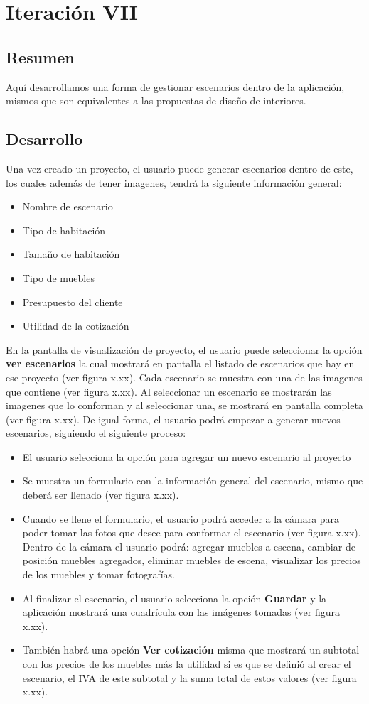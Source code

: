\section{Iteración VII}
\subsection{Resumen}
Aquí desarrollamos una forma de gestionar escenarios dentro de la aplicación, mismos que son equivalentes a las propuestas de diseño de interiores.

\subsection{Desarrollo}
Una vez creado un proyecto, el usuario puede generar escenarios dentro de este, los cuales además de tener imagenes, tendrá la siguiente información general:
\begin{itemize}
	\item Nombre de escenario
	\item Tipo de habitación
	\item Tamaño de habitación
	\item Tipo de muebles
	\item Presupuesto del cliente
	\item Utilidad de la cotización
\end{itemize}

En la pantalla de visualización de proyecto, el usuario puede seleccionar la opción \textbf{ver escenarios} la cual mostrará en pantalla el listado de escenarios que hay en ese proyecto (ver figura x.xx). Cada escenario se muestra con una de las imagenes que contiene (ver figura x.xx). Al seleccionar un escenario se mostrarán las imagenes que lo conforman y al seleccionar una, se mostrará en pantalla completa (ver figura x.xx). De igual forma, el usuario podrá empezar a generar nuevos escenarios, siguiendo el siguiente proceso:
\begin{itemize}
	\item El usuario selecciona la opción para agregar un nuevo escenario al proyecto
	\item Se muestra un formulario con la información general del escenario, mismo que deberá ser llenado (ver figura x.xx).
	\item Cuando se llene el formulario, el usuario podrá acceder a la cámara para poder tomar las fotos que desee para conformar el escenario (ver figura x.xx). Dentro de la cámara el usuario podrá: agregar muebles a escena, cambiar de posición muebles agregados, eliminar muebles de escena, visualizar los precios de los muebles y tomar fotografías.
	\item Al finalizar el escenario, el usuario selecciona la opción \textbf{Guardar} y la aplicación mostrará una cuadrícula con las imágenes tomadas (ver figura x.xx).
	\item También habrá una opción \textbf{Ver cotización} misma que mostrará un subtotal con los precios de los muebles más la utilidad si es que se definió al crear el escenario, el IVA de este subtotal y la suma total de estos valores (ver figura x.xx).
\end{itemize}


